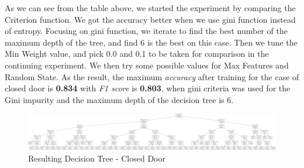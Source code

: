 \documentclass[conference]{IEEEtran}
\begin{document}
As we can see from the table above, we started the experiment by comparing the Criterion function. We got the accuracy better when we use gini function instead of entropy. Focusing on gini function, we iterate to find the best number of the maximum depth of the tree, and find 6 is the best on this case. Then we tune the Min Weight value, and pick 0.0 and 0.1 to be taken for comparison in the continuing experiment. We then try some possible values for Max Features and Random State. As the result, the maximum \textit{accuracy} after training for the case of closed door is \textbf{0.834} with \textit{F1 score} is \textbf{0.803}, when gini criteria was used for the Gini impurity and the maximum depth of the decision tree is 6. \\


\begin{figure}[H]
	\includegraphics[width=1\columnwidth]{tree.png}
	\caption{Resulting Decision Tree - Closed Door}
	\label{Tree1}
\end{figure}
\end{document}
